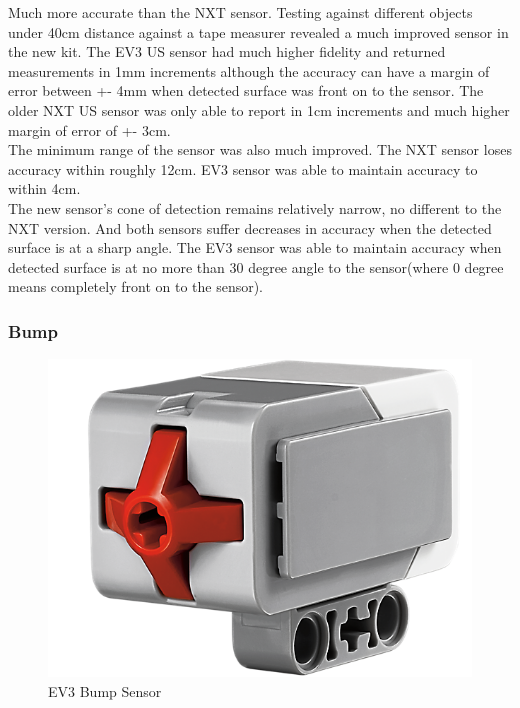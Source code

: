 \documentclass[11pt, a4paper, oneside]{article}
\begin{document}
		Much more accurate than the NXT sensor. Testing against different objects under 40cm distance against a tape measurer revealed a much improved sensor in the new kit. The EV3 US sensor had much higher fidelity and returned measurements in 1mm increments although the accuracy can have a margin of error between +- 4mm when detected surface was front on to the sensor. The older NXT US sensor was only able to report in 1cm increments and much higher margin of error of +- 3cm. \\

  		The minimum range of the sensor was also much improved. The NXT sensor loses accuracy within roughly 12cm. EV3 sensor was able to maintain accuracy to within 4cm. \\

  		The new sensor's cone of detection remains relatively narrow, no different to the NXT version. And both sensors suffer decreases in accuracy when the detected surface is at a sharp angle. The EV3 sensor was able to maintain accuracy when detected surface is at no more than 30 degree angle to the sensor(where 0 degree means completely front on to the sensor).\\


  		\subsubsection{Bump}
		\begin{figure}[h]
	  	\centering
	  	\includegraphics[scale=0.25]{img/EV3BumpSensor.png}
		\caption{EV3 Bump Sensor}
		\end{figure}	 		
 		
\end{document}
